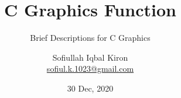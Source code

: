 % 
%
%
%
%
%
%
%

\documentclass[9 pt]{beamer}

\usepackage
{
	listings, %
	authblk, %
	anyfontsize
}

\title[Graphics Tutorial]{C Graphics Function}
\subtitle{Brief Descriptions for C Graphics}
\author[S. I. Kiron]
{
	Sofiullah Iqbal Kiron \\
	\href{mailto:sofiul.k.1023@gmail.com}{sofiul.k.1023@gmail.com}
}
\date[Wednesday]{30 Dec, 2020}

\lstset
{
 language = C++,
 backgroundcolor = \color{white},
 basicstyle = \footnotesize\ttfamily,
 keywordstyle = \color{blue},
 commentstyle = \color{green!80}\tiny,
 showstringspaces = false,
 stringstyle = \color{red},
 captionpos = b
}




\frame
{
	\titlepage
}

